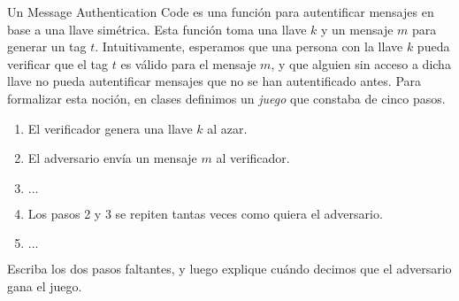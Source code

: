 
Un Message Authentication Code es una función para autentificar mensajes en base a una llave simétrica. Esta función toma una llave $k$ y un mensaje $m$ para generar un tag $t$. Intuitivamente, esperamos que una persona con la llave $k$ pueda verificar que el tag $t$ es válido para el mensaje $m$, y que alguien sin acceso a dicha llave no pueda autentificar mensajes que no se han autentificado antes. Para formalizar esta noción, en clases definimos un \emph{juego} que constaba de cinco pasos.
\begin{enumerate}
  \item El verificador genera una llave $k$ al azar.
  \item El adversario envía un mensaje $m$ al verificador.
  \item $\ldots$
  \item Los pasos 2 y 3 se repiten tantas veces como quiera el adversario.
  \item $\ldots$
\end{enumerate}
Escriba los dos pasos faltantes,
y luego explique cuándo decimos que el adversario gana el juego.
